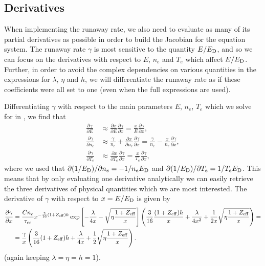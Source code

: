 \documentclass{notes}
\newcommand{\ED}{E_{\rm D}}
\newcommand{\Zeff}{Z_{\rm eff}}
\begin{document}
    \subsection*{Derivatives}
    When implementing the runaway rate, we also need to evaluate as many of its
    partial derivatives as possible in order to build the Jacobian for the
    equation system. The runaway rate $\gamma$ is most sensitive to the
    quantity $E/\ED$, and so we can focus on the derivatives with respect
    to $E$, $n_e$ and $T_e$ which affect $E/\ED$. Further, in order to avoid the
    complex dependencies on various quantities in the expressions for $\lambda$,
    $\eta$ and $h$, we will differentiate the runaway rate as if these
    coefficients were all set to one (even when the full expressions are used).

    Differentiating $\gamma$ with respect to the main parameters $E$, $n_e$,
    $T_e$ which we solve for in \DREAM, we find that
    \begin{equation}
        \begin{aligned}
            \frac{\partial\gamma}{\partial E} &\approx
                \frac{\partial x}{\partial E}\frac{\partial\gamma}{\partial x} =
                \frac{x}{E}\frac{\partial\gamma}{\partial x},\\
            \frac{\partial\gamma}{\partial n_e} &\approx \frac{\gamma}{n_e} +
                \frac{\partial x}{\partial n_e}\frac{\partial\gamma}{\partial x} =
                \frac{\gamma}{n_e} - \frac{x}{n_e}\frac{\partial\gamma}{\partial x},\\
            \frac{\partial\gamma}{\partial T_e} &\approx
                \frac{\partial x}{\partial T_e}\frac{\partial\gamma}{\partial x} =
                \frac{x}{T_e}\frac{\partial\gamma}{\partial x},
        \end{aligned}
    \end{equation}
    where we used that $\partial(1/\ED)/\partial n_e = -1/n_e\ED$ and
    $\partial(1/\ED)/\partial T_e = 1/T_e\ED$. This means that by only
    evaluating one derivative analytically we can easily retrieve the three
    derivatives of physical quantities which we are most interested. The
    derivative of $\gamma$ with respect to $x=E/\ED$ is given by
    \begin{equation}
        \begin{aligned}
            \frac{\partial\gamma}{\partial x} &=
                \frac{Cn_e}{\tau_{ee}}x^{-\frac{3}{16}(1+\Zeff)h}
                \exp\left[ -\frac{\lambda}{4x} - \sqrt{\eta\frac{1+\Zeff}{x}} \right]
                \left( \frac{3}{16}\frac{(1+\Zeff)h}{x} + \frac{\lambda}{4x^2} +
                \frac{1}{2x}\sqrt{\eta\frac{1+\Zeff}{x}}\right) =\\
            &= \frac{\gamma}{x}\left(
                \frac{3}{16}(1+\Zeff)h + \frac{\lambda}{4x} +
                \frac{1}{2}\sqrt{\eta\frac{1+\Zeff}{x}}
            \right).
        \end{aligned}
    \end{equation}
    (again keeping $\lambda=\eta=h=1$).
\end{document}

